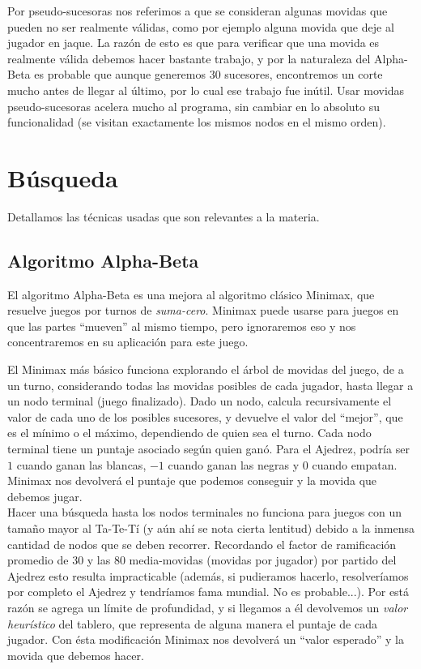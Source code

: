 \documentclass{article}
\begin{document}
Por pseudo-sucesoras nos referimos a que se consideran algunas movidas
que pueden no ser realmente válidas, como por ejemplo alguna movida que
deje al jugador en jaque. La razón de esto es que para verificar que
una movida es realmente válida debemos hacer bastante trabajo, y por la
naturaleza del Alpha-Beta es probable que aunque generemos 30 sucesores,
encontremos un corte mucho antes de llegar al último, por lo cual
ese trabajo fue inútil. Usar movidas pseudo-sucesoras acelera mucho
al programa, sin cambiar en lo absoluto su funcionalidad (se visitan
exactamente los mismos nodos en el mismo orden).
\\

\section{Búsqueda}
Detallamos las técnicas usadas que son relevantes a la materia.

\subsection{Algoritmo Alpha-Beta}

El algoritmo Alpha-Beta es una mejora al algoritmo clásico Minimax, que
resuelve juegos por turnos de \emph{suma-cero}\footnotemark . Minimax
puede usarse para juegos en que las partes ``mueven'' al mismo tiempo,
pero ignoraremos eso y nos concentraremos en su aplicación para este
juego.
\\


El Minimax más básico funciona explorando el árbol de movidas del
juego, de a un turno, considerando todas las movidas posibles de cada
jugador, hasta llegar a un nodo terminal (juego finalizado). Dado un
nodo, calcula recursivamente el valor de cada uno de los posibles
sucesores, y devuelve el valor del ``mejor'', que es el mínimo o el
máximo, dependiendo de quien sea el turno. Cada nodo terminal tiene
un puntaje asociado según quien ganó. Para el Ajedrez, podría ser
$1$ cuando ganan las blancas, $-1$ cuando ganan las negras y $0$ cuando
empatan. Minimax nos devolverá el puntaje que podemos conseguir y la
movida que debemos jugar.
\\

Hacer una búsqueda hasta los nodos terminales no funciona para juegos
con un tamaño mayor al Ta-Te-Tí (y aún ahí se nota cierta lentitud)
debido a la inmensa cantidad de nodos que se deben recorrer. Recordando
el factor de ramificación promedio de 30 y las 80 media-movidas
(movidas por jugador) por partido del Ajedrez esto resulta impracticable
(además, si pudieramos hacerlo, resolveríamos por completo el Ajedrez
y tendríamos fama mundial. No es probable...). Por está razón se
agrega un límite de profundidad, y si llegamos a él devolvemos un
\emph{valor heurístico} del tablero, que representa de alguna manera el
puntaje de cada jugador. Con ésta modificación Minimax nos devolverá
un ``valor esperado'' y la movida que debemos hacer.
\\
\end{document}
